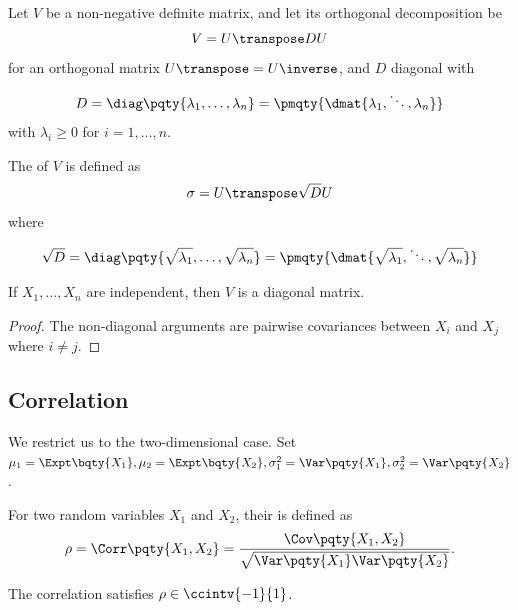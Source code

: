 \begin{definition}
    \label{def:sqrt-non-negative-definite-matrix}%
    Let \(V\) be a non-negative definite matrix, and let its orthogonal decomposition be
    \[
        V = U\transpose D U
    \]
    for an orthogonal matrix \(U\transpose = U\inverse\), and \(D\) diagonal with
    \[
        D = \diag\pqty{\lambda_1, \ldots, \lambda_n} = \pmqty{\dmat{\lambda_1, \ddots, \lambda_n}}
    \]
    with \(\lambda_i \geq 0\) for \(i = 1, \ldots, n\).

    The  of \(V\) is defined as
    \[
        \sigma = U\transpose \sqrt{D} U
    \]
    where
    \[
        \sqrt{D} = \diag\pqty{\sqrt{\lambda_1}, \ldots, \sqrt{\lambda_n}} = \pmqty{\dmat{\sqrt{\lambda_1}, \ddots, \sqrt{\lambda_n}}}
    \]
\end{definition}

\begin{claim}
    \label{claim:indep-diagonal-variance}%
    If \(X_1, \ldots, X_n\) are independent, then \(V\) is a diagonal matrix.
\end{claim}

\begin{proof}
    The non-diagonal arguments are pairwise covariances between \(X_i\) and \(X_j\) where \(i \neq j\).
\end{proof}

\subsection{Correlation}

We restrict us to the two-dimensional case. Set \(\mu_1 = \Expt\bqty{X_1}, \mu_2 = \Expt\bqty{X_2}, \sigma_1^2 = \Var\pqty{X_1}, \sigma_2^2 = \Var\pqty{X_2}\).

\begin{definition}[Correlation]
   \label{def:corr}%
    For two random variables \(X_1\) and \(X_2\), their  is defined as
    \[
        \rho = \Corr\pqty{X_1, X_2} = \frac{\Cov\pqty{X_1, X_2}}{\sqrt{\Var\pqty{X_1} \Var\pqty{X_2}}}.
    \]
\end{definition}

\begin{claim}
    \label{claim:corr-abs-val-no-more-one}%
    The correlation satisfies \(\rho \in \ccintv{-1}{1}\).
\end{claim}


